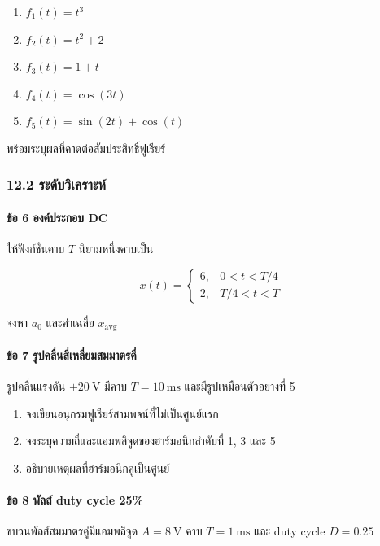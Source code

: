 \begin{enumerate}
\def\labelenumi{\arabic{enumi}.}
\item
  \(f_1(t)=t^3\)
\item
  \(f_2(t)=t^2+2\)
\item
  \(f_3(t)=1+t\)
\item
  \(f_4(t)=\cos(3t)\)
\item
  \(f_5(t)=\sin(2t)+\cos(t)\)
\end{enumerate}

พร้อมระบุผลที่คาดต่อสัมประสิทธิ์ฟูเรียร์

\subsubsection{12.2 ระดับวิเคราะห์}

\paragraph{ข้อ 6 องค์ประกอบ DC}

ให้ฟังก์ชันคาบ \(T\) นิยามหนึ่งคาบเป็น

\[
x(t)=
\begin{cases}
6, & 0<t<T/4\\
2, & T/4<t<T
\end{cases}
\]

จงหา \(a_0\) และค่าเฉลี่ย \(x_{\mathrm{avg}}\)

\paragraph{ข้อ 7 รูปคลื่นสี่เหลี่ยมสมมาตรคี่}

รูปคลื่นแรงดัน \(\pm20\ \text{V}\) มีคาบ \(T=10\ \text{ms}\) และมีรูปเหมือนตัวอย่างที่ 5

\begin{enumerate}
\def\labelenumi{\arabic{enumi}.}
\item
  จงเขียนอนุกรมฟูเรียร์สามพจน์ที่ไม่เป็นศูนย์แรก
\item
  จงระบุความถี่และแอมพลิจูดของฮาร์มอนิกลำดับที่ 1, 3 และ 5
\item
  อธิบายเหตุผลที่ฮาร์มอนิกคู่เป็นศูนย์
\end{enumerate}

\paragraph{ข้อ 8 พัลส์ duty cycle 25\%}

ขบวนพัลส์สมมาตรคู่มีแอมพลิจูด \(A=8\ \text{V}\) คาบ \(T=1\ \text{ms}\) และ duty cycle \(D=0.25\)

